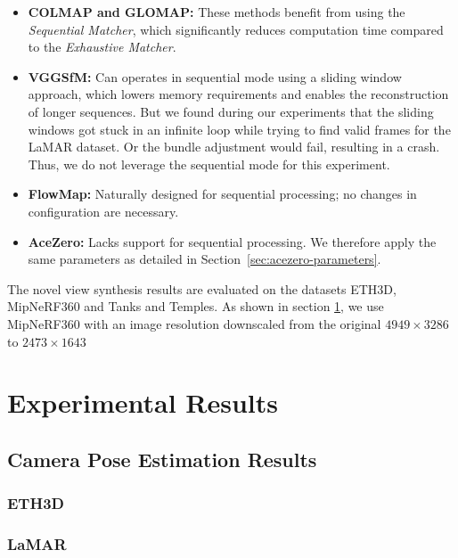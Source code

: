 \begin{itemize}
    \item \textbf{COLMAP and GLOMAP:} These methods benefit from using the \textit{Sequential Matcher}, which significantly reduces computation time compared to the \textit{Exhaustive Matcher}.
    \item \textbf{VGGSfM:} Can operates in sequential mode using a sliding window approach, which lowers memory requirements and enables the reconstruction of longer sequences. 
                           But we found during our experiments that the sliding windows got stuck in an infinite loop while trying to find valid frames for the LaMAR dataset. Or the bundle adjustment would fail, resulting in a crash.
                           Thus, we do not leverage the sequential mode for this experiment.
    \item \textbf{FlowMap:} Naturally designed for sequential processing; no changes in configuration are necessary.
    \item \textbf{AceZero:} Lacks support for sequential processing. We therefore apply the same parameters as detailed in Section~\ref{sec:acezero-parameters}.
\end{itemize}

The novel view synthesis results are evaluated on the datasets ETH3D, MipNeRF360 and Tanks and Temples. 
As shown in section \ref{sec:experimental-results}, we use MipNeRF360 with an image resolution downscaled from the original $4949 \times 3286$ to $2473 \times 1643$

\section{Experimental Results}\label{sec:experimental-results}

\subsection{Camera Pose Estimation Results}\label{sec:camera-pose-estimation-results}

\subsubsection{ETH3D}\label{sec:eth3d-evaluation-results}


\subsubsection{LaMAR}\label{sec:lamar-evaluation-results}


